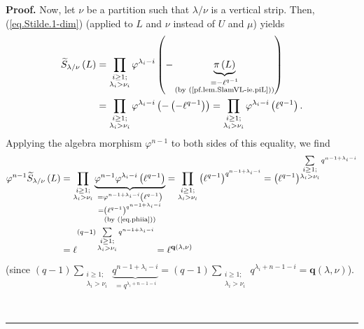 \documentclass[numbers=enddot,12pt,final,onecolumn,notitlepage]{scrartcl}%
\numberwithin{exer}{section}
\theoremstyle{definition}
\newenvironment{proof}[1][Proof]{\noindent\textbf{#1.} }{\ \rule{0.5em}{0.5em}}
\let\sumnonlimits\sum
\let\prodnonlimits\prod
\renewcommand{\sum}{\sumnonlimits\limits}
\renewcommand{\prod}{\prodnonlimits\limits}
\theoremstyle{plainsl}
\begin{document}
\begin{proof}
Now, let $\nu$ be a partition such that $\lambda/\nu$ is a vertical strip.
Then, (\ref{eq.Stilde.1-dim}) (applied to $L$ and $\nu$ instead of $U$ and
$\mu$) yields
\begin{align*}
\widetilde{S}_{\lambda/\nu}\left(  L\right)   &  =\prod_{\substack{i\geq
1;\\\lambda_{i}>\nu_{i}}}\varphi^{\lambda_{i}-i}\left(  -\underbrace{\pi
\left(  L\right)  }_{\substack{=-\ell^{q-1}\\\text{(by
(\ref{pf.lem.SlamVL-ie.piL}))}}}\right) \\
&  =\prod_{\substack{i\geq1;\\\lambda_{i}>\nu_{i}}}\varphi^{\lambda_{i}%
-i}\left(  -\left(  -\ell^{q-1}\right)  \right)  =\prod_{\substack{i\geq
1;\\\lambda_{i}>\nu_{i}}}\varphi^{\lambda_{i}-i}\left(  \ell^{q-1}\right)  .
\end{align*}
Applying the algebra morphism $\varphi^{n-1}$ to both sides of this equality,
we find
\begin{align}
\varphi^{n-1}\widetilde{S}_{\lambda/\nu}\left(  L\right)   &  =\prod
_{\substack{i\geq1;\\\lambda_{i}>\nu_{i}}}\underbrace{\varphi^{n-1}%
\varphi^{\lambda_{i}-i}\left(  \ell^{q-1}\right)  }_{\substack{=\varphi
^{n-1+\lambda_{i}-i}\left(  \ell^{q-1}\right)  \\=\left(  \ell^{q-1}\right)
^{q^{n-1+\lambda_{i}-i}}\\\text{(by (\ref{eq.phiia}))}}}=\prod
_{\substack{i\geq1;\\\lambda_{i}>\nu_{i}}}\left(  \ell^{q-1}\right)
^{q^{n-1+\lambda_{i}-i}}=\left(  \ell^{q-1}\right)  ^{\sum_{\substack{i\geq
1;\\\lambda_{i}>\nu_{i}}}q^{n-1+\lambda_{i}-i}}\nonumber\\
&  =\ell^{\left(  q-1\right)  \sum_{\substack{i\geq1;\\\lambda_{i}>\nu_{i}%
}}q^{n-1+\lambda_{i}-i}}=\ell^{\mathbf{q}\left(  \lambda,\nu\right)  }
\label{pf.lem.SlamVL-ie.5}%
\end{align}
(since $\left(  q-1\right)  \sum_{\substack{i\geq1;\\\lambda_{i}>\nu_{i}%
}}\underbrace{q^{n-1+\lambda_{i}-i}}_{=q^{\lambda_{i}+n-1-i}}=\left(
q-1\right)  \sum_{\substack{i\geq1;\\\lambda_{i}>\nu_{i}}}q^{\lambda
_{i}+n-1-i}=\mathbf{q}\left(  \lambda,\nu\right)  $).


\end{proof}
\end{document}
